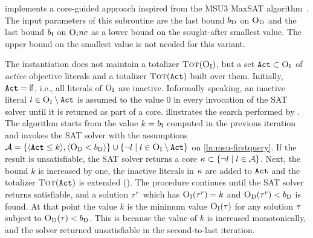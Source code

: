 \msu{} implements a core-guided approach inspired from the MSU3 MaxSAT algorithm~\autocites{DBLP:journals/corr/abs-0712-1097}.
The input parameters of this subroutine are the last bound $b_{\text{D}}$ on $\textsc{O}_{\text{D}}$ and the last bound $b_{\text{I}}$ on $\textsc{O}_inc$ as a lower bound on the sought-after smallest value.
The upper bound on the smallest value is not needed for this variant.

The \msu{} instantiation does not maintain a totalizer $\textsc{Tot}(\textsc{O}_{\text{I}})$, but a set $\texttt{Act} \subset \textsc{O}_{\text{I}}$ of \emph{active} objective literals and a totalizer $\textsc{Tot}(\texttt{Act})$ built over them. 
Initially, $\texttt{Act} = \emptyset$, i.e., all literals of $\textsc{O}_{\text{I}}$ are inactive.
Informally speaking, an inactive literal $l \in \textsc{O}_{\text{I}} \setminus \texttt{Act}$ is assumed to the value $0$ in every invocation of the SAT solver until it is returned as part of a core.
 illustrates the search performed by \msu{}.
The algorithm starts from the value $k=b_{\text{I}}$ computed in the previous iteration and invokes the SAT solver with the assumptions $\mathcal{A} = \{\langle \texttt{Act} \leq k \rangle, \langle \textsc{O}_{\text{D}} < b_{\text{D}} \rangle  \} \cup \{ \lnot l \mid l \in \textsc{O}_{\text{I}} \setminus \texttt{Act}\}$ on \cref{ln:msu-firstquery}.
If the result is unsatisfiable, the SAT solver returns a core $\kappa \subset \{\lnot l \mid l \in \mathcal{A}\}$.
Next, the bound $k$ is increased by one, the inactive literals in $\kappa$ are added to $\texttt{Act}$ and the totalizer $\textsc{Tot}(\texttt{Act})$ is extended ().
The procedure continues until the SAT solver returns satisfiable, and a solution $\tau^r$ which has $\textsc{O}_{\text{I}}(\tau^r) = k$ and $\textsc{O}_{\text{D}}(\tau^r) < b_{\text{D}}$ is found.
At that point the value $k$ is the minimum value $\textsc{O}_{\text{I}}(\tau)$ for any solution $\tau$ subject to $\textsc{O}_{\text{D}}(\tau) < b_{\text{D}}$.
This is because the value of $k$ is increased monotonically, and the solver returned unsatisfiable in the second-to-last iteration. 

